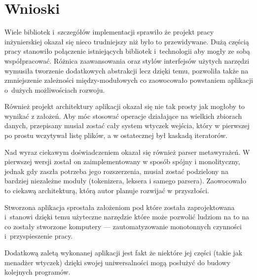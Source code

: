 \chapter{Wnioski}
\label{wnioski}

\par
Wiele bibliotek i~szczegółów implementacji sprawiło że projekt pracy inżynierskiej okazał się nieco trudniejszy niż było to przewidywane.
Dużą częścią pracy stanowiło połączenie istniejących bibliotek i~technologii aby mogły ze sobą współpracować. Różnica zaawansowania oraz stylów interfejsów użytych narzędzi wymusiła tworzenie dodatkowych abstrakcji lecz dzięki temu, pozwoliła także na zmniejszenie zależności między-modułowych co zaowocowało powstaniem aplikacji o~dużych możliwościach rozwoju.

\par
Również projekt architektury aplikacji okazał się nie tak prosty jak mogłoby to wynikać z założeń. Aby móc stosować operacje działające na wielkich zbiorach danych, przepisany musiał zostać cały system wtyczek wejścia, który w pierwszej po prostu wczytywał listę plików, a w ostatecznej był kaskadą iteratorów.

\par
Nad wyraz ciekawym doświadczeniem okazał się również parser metawyrażeń.
W pierwszej wersji został on zaimplementowany w sposób spójny i monolityczny, jednak gdy zaszła potrzeba jego rozszerzenia, musiał zostać podzielony na bardziej niezależne moduły (tokenizera, leksera i samego parsera). Zaowocowało to ciekawą architekturą, którą autor planuje rozwijać w przyszłości.

\par
Stworzona aplikacja sprostała założeniom pod które została zaprojektowana i~stanowi dzięki temu użyteczne narzędzie które może pozwolić ludziom na to na co zostały stworzone komputery --- zautomatyzowanie monotonnych czynności i~przyspieszenie pracy.

\par
Dodatkową zaletą wykonanej aplikacji jest fakt że niektóre jej części (takie jak menadżer wtyczek) dzięki swojej uniwersalności mogą posłużyć do budowy kolejnych programów.
